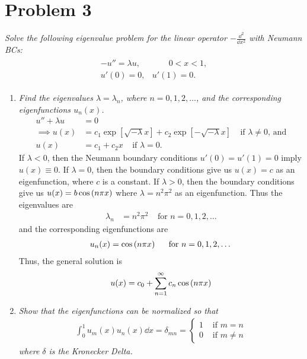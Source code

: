 \documentclass[paper=a4, fontsize=11pt]{scrartcl} %
\theoremstyle{plain}
\numberwithin{equation}{section} %
\numberwithin{figure}{section} %
\numberwithin{table}{section} %
\begin{document}
\section{Problem 3}
\emph{Solve the following eigenvalue problem for the linear operator $-\frac{\dd^2}{\dd x^2}$ with Neumann BCs:}
\begin{align*}
    \begin{array}{rr}
        -u'' = \lambda u, & \qquad 0 < x < 1, \\
        u'(0) = 0, & u'(1) = 0.
    \end{array}
\end{align*}
\begin{enumerate}[\bf (a)]
    \item 
        \emph{Find the eigenvalues $\lambda = \lambda_n$, where $n = 0, 1, 2, \dots$, and the corresponding eigenfunctions $u_n(x)$.}
        \begin{align*}
            u'' + \lambda u &= 0 \\
            \implies u(x) &= c_1\exp[\sqrt{-\lambda}x] + c_2\exp[-\sqrt{-\lambda}x]\ \ \ \ \ \text{if $\lambda \neq 0$, and} \\
            u(x) &= c_1 + c_2 x\ \ \ \ \ \text{if $\lambda = 0$.}
        \end{align*}
        If $\lambda < 0$, then the Neumann boundary conditions $u'(0) = u'(1) = 0$ imply $u(x) \equiv 0$.  If $\lambda = 0$, then the boundary conditions give us $u(x) = c$ as an eigenfunction, where $c$ is a constant.  If $\lambda > 0$, then the boundary conditions give us $u(x) = b\cos\qty(n\pi x)$ where $\lambda = n^2\pi^2$ as an eigenfunction.  Thus the eigenvalues are
        \begin{align*}
        \lambda_n &= n^2\pi^2\ \ \ \ \ \text{for $n = 0, 1, 2, \dots$}
        \end{align*}
        and the corresponding eigenfunctions are
        \begin{align*}
            u_n(x) = \cos\qty(n\pi x)\ \ \ \ \ \text{for $n = 0, 1, 2, \dots$}
        \end{align*}
        Thus, the general solution is
        \begin{align*}
            u(x) = c_0 + \sum_{n=1}^\infty c_n \cos\qty(n\pi x)
        \end{align*}
    \item
        \emph{Show that the eigenfunctions can be normalized so that}
        \begin{align*}
            \int_0^1 u_m(x) u_n(x) \dd x = \delta_{mn} = \begin{cases}
                1 & \text{ if }m = n \\
                0 & \text{ if }m \neq n
            \end{cases}
        \end{align*}
        \emph{where $\delta$ is the Kronecker Delta.} \\


\end{enumerate}
\end{document}
